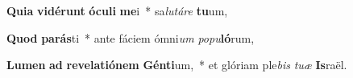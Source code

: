 \item \textbf{Qui}\textbf{a} \textbf{vi}\textbf{dé}\textbf{runt} \textbf{ó}\textbf{cu}\textbf{li} \textbf{me}i~* sa\textit{lu}\textit{tá}\textit{re} \textbf{tu}um,
\item \textbf{Quod} \textbf{pa}\textbf{rás}ti~* ante fáciem ómni\textit{um} \textit{po}\textit{pu}\textbf{ló}rum,
\item \textbf{Lu}\textbf{men} \textbf{ad} \textbf{re}\textbf{ve}\textbf{la}\textbf{ti}\textbf{ó}\textbf{nem} \textbf{Gén}\textbf{ti}um,~* et glóriam ple\textit{bis} \textit{tu}\textit{æ} \textbf{Is}raël.
